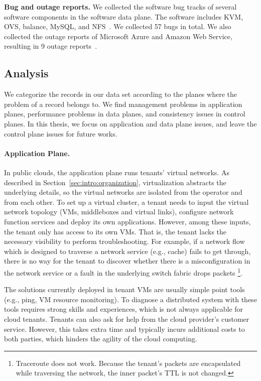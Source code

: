 {\bf Bug and outage reports.} We collected the software bug tracks of several software components in the software data plane. The software includes KVM, OVS, balance, MySQL, 
and NFS~\cite{kvmbugs, ovsbugs, balancebugs, mysqlbugs, nfsbugs}. We collected 57 bugs in total. We also collected the outage reports of Microsoft Azure and Amazon Web Service, resulting in 9 outage reports~\cite{awsoutages, azureoutages}.


\subsection{Analysis}
We categorize the records in our data set according to the planes where the problem of a record belongs to. We find management problems in application planes, performance problems in data planes, and consistency issues in control planes. In this thesis, we focus on application and data plane issues, and leave the control plane issues for future works.

\paragraph{Application Plane.}
In public clouds, the application plane runs tenants' virtual networks. As described in 
Section~\ref{sec:intro:organization}, virtualization abstracts the underlying details, so the virtual
networks are isolated from the operator and from each other. To set up a virtual cluster,
a tenant needs to input the virtual network topology (VMs, middleboxes and 
virtual links), configure network function services 
and deploy its own applications. However, among these inputs, the tenant only has access 
to its own VMs. That is, the tenant lacks the necessary visibility to perform troubleshooting.
For example, if a network flow which is designed to traverse a network service (e.g., cache) 
fails to get through, there is no way for the tenant to discover whether there is a misconfiguration
in the network service or a fault in the underlying switch fabric drops packets
\footnote{Traceroute does not work. Because the tenant's packets are encapsulated while 
traversing the network, the inner packet's TTL is not changed.}. 

The solutions currently deployed in tenant VMs are usually simple point tools (e.g., ping, 
VM resource monitoring). To diagnose a distributed system with these tools requires strong
skills and experiences, which is not always applicable for cloud tenants.
Tenants can also ask for help from the cloud provider's customer service. However, this takes
extra time and typically incurs additional costs to both parties, which hinders the agility of the cloud computing.
